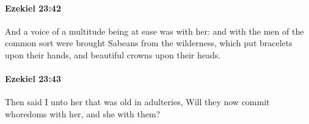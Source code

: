 		\paragraph{Ezekiel 23:42} %
			\label{EZEKIEL-23-42}

			And a voice of a multitude being at ease was with her: and with the men of the common sort were brought Sabeans from the wilderness, which put bracelets upon their hands, and beautiful crowns upon their heads.


		\paragraph{Ezekiel 23:43} %
			\label{EZEKIEL-23-43}

			Then said I unto her that was old in adulteries, Will they now commit whoredoms with her, and she with them?


